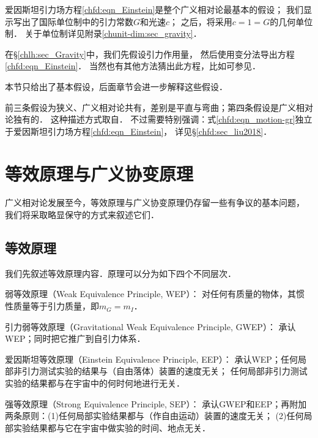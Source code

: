 爱因斯坦引力场方程\eqref{chfd:eqn_Einstein}是整个广义相对论最基本的假设；
我们显示写出了国际单位制中的引力常数$G$和光速$c$；
之后，将采用$c=1= G$的几何单位制．
关于单位制详见附录\ref{chunit-dim:sec_gravity}．

在\S\ref{chlh:sec_Gravity}中，我们先假设引力作用量，
然后使用变分法导出方程\eqref{chfd:eqn_Einstein}．
当然也有其他方法猜出此方程，比如可参见\parencite[\S 7.1--7.2]{weinberg_grav-1972}．





本节只给出了基本假设，后面章节会进一步解释这些假设．


\begin{remark}
	前三条假设为狭义、广义相对论共有，差别是平直与弯曲；第四条假设是广义相对论独有的．    
	这种描述方式取自\textcite[Ch.3]{hawking-ellis1973}．
	不过需要特别强调：式\eqref{chfd:eqn_motion-gr}独立于爱因斯坦引力场方程\eqref{chfd:eqn_Einstein}，
	详见\S\ref{chfd:sec_liu2018}．
\end{remark}


\section{等效原理与广义协变原理}
广义相对论发展至今，等效原理与广义协变原理仍存留一些有争议的基本问题，
我们将采取略显保守的方式来叙述它们．

\subsection{等效原理}

我们先叙述等效原理内容\cite[Ch.2,Ch.3]{will_tegp-2018}．原理可以分为如下四个不同层次．

{\heiti 弱等效原理（Weak Equivalence Principle, WEP）}：
对任何有质量的物体，其惯性质量等于引力质量，即$m_G=m_I$．

{\heiti 引力弱等效原理（Gravitational Weak Equivalence Principle, GWEP）}：
承认WEP；同时把它推广到自引力体系．


{\heiti 爱因斯坦等效原理（Einstein Equivalence Principle, EEP）}：
承认WEP；任何局部非引力测试实验的结果与（自由落体）装置的速度无关；
任何局部非引力测试实验的结果都与在宇宙中的何时何地进行无关．



{\heiti 强等效原理（Strong Equivalence Principle, SEP）}：
承认GWEP和EEP；再附加两条原则：(1)任何局部实验结果都与（作自由运动）装置的速度无关；
(2)任何局部实验结果都与它在宇宙中做实验的时间、地点无关．

